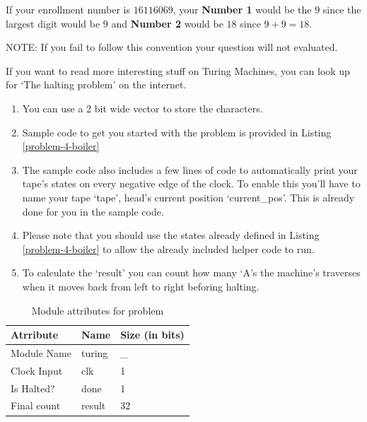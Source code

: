 \documentclass[a4paper,10pt]{article}
\theoremstyle{mytheor}
\newcommand{
  \insertverilog}[3]{
  
}
\newcounter{problemNumber}
\newcounter{hintCount} %
\newcommand{\hintcounter}[1]{%
  \refstepcounter{hintCount}%
  \thehintCount%
  \label{#1}}%
\newcounter{hintcnt}
\newcommand{\hint}[2] {
  \begin{tcolorbox}[colback=blue!5!white,colframe=blue!75!black,title=\textbf{Hint - \hintcounter{#1}}]  
    #2
  \end{tcolorbox}
  \addtocounter{hintcnt}{1}
}
\begin{document}
{\begin{legal}
      If your enrollment number is $16116069$, your \textbf{Number 1}
      would be the $9$ since the largest digit would be $9$ and
      \textbf{Number 2} would be $18$ since
      $9+9=18$.

      {\color{red}NOTE:} If you fail to follow this convention your
      question will not evaluated.      
    \end{legal}
  If you want to read more interesting stuff on Turing Machines, you
  can look up for `The halting problem' on the internet.

  \hint{hint:problem-3}{ 
    \begin{enumerate}
    \item You can use a 2 bit wide vector to store the characters.
    \item Sample code to get you started with the problem is provided
      in Listing \ref{problem-4-boiler}
    \item The sample code also includes a few lines of code to
      automatically print your tape's states on every negative edge of
      the clock. To enable this you'll have to name your tape `tape',
      head's current position `current\_pos'. This is already done for 
      you in the sample code.
    \item Please note that you should use the states already defined
      in Listing \ref{problem-4-boiler} to allow the already included
      helper code to run.
    \item To calculate the `result' you can count how many `A's the 
      machine's traverses when it moves back from left to right
      beforing halting.
    \end{enumerate}
  }

  \insertverilog{./verilog_files/problem4Boiler.v}{problem-4-boiler}{Code
    to get you started with problem 4.}
     
  \begin{table}[!ht]
    \centering
    \caption{Module attributes for problem \theproblemNumber}
    \label{table:problem-4-attr}
    \renewcommand{\arraystretch}{1.1} 
    \begin{tabularx}{0.8\textwidth}{|X|X|X|}
      \hline
      \rowcolor{greatblue}
      \color{white} Atrribute & \color{white}Name & \color{white}Size (in bits) \\
      \hline
      Module Name  & turing          & \_  \\
      Clock Input  & clk             &  1  \\
      Is Halted?   & done            &  1  \\
      Final count  & result          & 32  \\
      \hline
    \end{tabularx}
  \end{table}

 }
\end{document}
